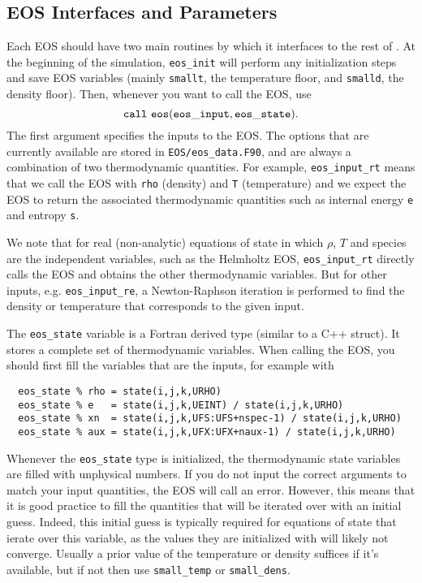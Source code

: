 \subsection{EOS Interfaces and Parameters}

Each EOS should have two main routines by which it interfaces to the
rest of \castro.  At the beginning of the simulation, {\tt eos\_init}
will perform any initialization steps and save EOS variables (mainly
\texttt{smallt}, the temperature floor, and \texttt{smalld}, the
density floor). Then, whenever you want to call the EOS, use
\[
  {\tt call\ eos (eos\_input, eos\_state)}.
\]
The first argument specifies the inputs to the EOS. The options
that are currently available are stored in
{\tt EOS/eos\_data.F90}, and are always a combination of two
thermodynamic quantities. For example, {\tt eos\_input\_rt} means
that we call the EOS with {\tt rho} (density) and {\tt T} (temperature)
and we expect the EOS to return the associated thermodynamic
quantities such as internal energy {\tt e} and entropy {\tt s}.

We note that for real (non-analytic) equations of state
in which $\rho$, $T$ and species are the independent variables, such
as the Helmholtz EOS, {\tt eos\_input\_rt} directly calls the EOS
and obtains the other thermodynamic variables. But for other inputs,
e.g. {\tt eos\_input\_re}, a Newton-Raphson iteration is performed
to find the density or temperature that corresponds to the given
input.

The {\tt eos\_state} variable is a Fortran derived type (similar to
a C++ struct). It stores a complete set of thermodynamic
variables. When calling the EOS, you should first fill the variables
that are the inputs, for example with
\begin{verbatim}
  eos_state % rho = state(i,j,k,URHO)
  eos_state % e   = state(i,j,k,UEINT) / state(i,j,k,URHO)
  eos_state % xn  = state(i,j,k,UFS:UFS+nspec-1) / state(i,j,k,URHO)
  eos_state % aux = state(i,j,k,UFX:UFX+naux-1) / state(i,j,k,URHO)
\end{verbatim}
Whenever the \texttt{eos\_state} type is initialized, the
thermodynamic state variables are filled with unphysical numbers. If
you do not input the correct arguments to match your input quantities,
the EOS will call an error. However, this means that it is good
practice to fill the quantities that will be iterated over with an
initial guess. Indeed, this initial guess is typically required for
equations of state that ierate over this variable, as the values
they are initialized with will likely not
converge. Usually a prior value of the temperature or density suffices
if it's available, but if not then use \texttt{small\_temp} or
\texttt{small\_dens}.

